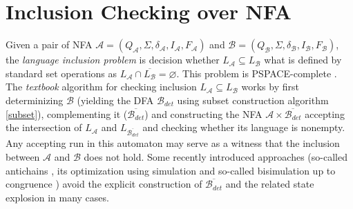 \chapter{Inclusion Checking over NFA}
\label{chapInclusion}
Given a pair of NFA $\mathcal{A}=(Q_\mathcal{A},\Sigma,\delta_\mathcal{A},I_\mathcal{A},F_\mathcal{A})$ 
and $\mathcal{B}=(Q_\mathcal{B},\Sigma,\delta_\mathcal{B},I_\mathcal{B},F_\mathcal{B})$, 
the \emph{language inclusion problem} is decision whether $L_\mathcal{A} \subseteq L_\mathcal{B}$ what is defined by standard set operations as
$L_\mathcal{A}\cap \overline{L_\mathcal{B}} = \varnothing$.
This problem is PSPACE-complete \cite{cav06}. The \emph{textbook} algorithm for checking inclusion $L_\mathcal{A}\subseteq L_\mathcal{B}$ works by first 
determinizing $\mathcal{B}$ (yielding the DFA 
$\mathcal{B}_{det}$ using subset construction algorithm \ref{subset}), 
complementing it ($\overline{\mathcal{B}_{det}}$) and constructing the NFA $\mathcal{A} \times \overline{\mathcal{B}_{det}}$ 
accepting the intersection of $L_{\mathcal{A}}$ and ${L_{\overline{\mathcal{B}_{det}}}}$ and
checking whether its language is nonempty. Any accepting run in this automaton may serve as a witness that the inclusion between $\mathcal{A}$ 
and $\mathcal{B}$ does not hold.
Some recently introduced approaches (so-called antichains \cite{cav06}, its optimization using simulation \cite{tacas10} and so-called bisimulation up to
congruence \cite{popl13}) avoid the explicit construction of $\overline{\mathcal{B}_{det}}$ and the related state explosion in many cases.

